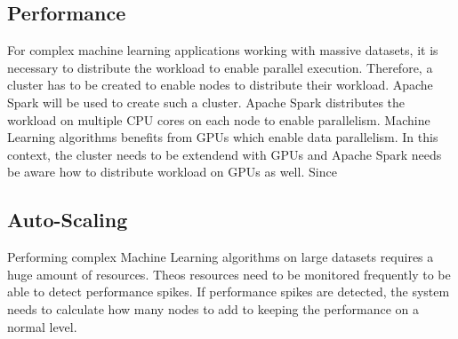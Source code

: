 \subsection{Performance}
For complex machine learning applications working with massive datasets, it is necessary to distribute the workload to enable parallel execution. Therefore, a cluster has to be created to enable nodes to distribute their workload. Apache Spark will be used to create such a cluster.
Apache Spark distributes the workload on multiple CPU cores on each node to enable parallelism. Machine Learning algorithms benefits from GPUs which enable data parallelism. In this context, the cluster needs to be extendend with GPUs and Apache Spark needs be aware how to distribute workload on GPUs as well.
Since 


\subsection{Auto-Scaling}
Performing complex Machine Learning algorithms on large datasets requires a huge amount of resources. Theos resources need to be monitored frequently to be able to detect performance spikes. If performance spikes are detected, the system needs to calculate how many nodes to add to keeping the performance on a normal level.









